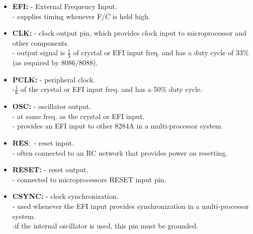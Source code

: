 \documentclass[12pt]{article}
\begin{document}
\begin{itemize}
	\item \textbf{EFI:} - External Frequency Input.\\
	- supplies timing whenever F/$\overline{C}$ is held high.\\
	
	\item\textbf{CLK:} - clock output pin, which provides clock input to microprocessor and other components.\\
	
	- output signal is $\frac{1}{3}$ of crystal or EFI input freq. and has a duty cycle of 33\%(as required by 8086/8088). \\
	
	\item \textbf{PCLK:} - peripheral clock.\\
	-$\frac{1}{6}$ of the crystal or EFI input freq. and has a 50\% duty cycle.
	
	\item \textbf{OSC:} - oscillator output.\\
	- at same freq. as the crystal or EFI input.\\
	- provides an EFI input to other 8284A in a multi-processor system.\\
	
	\item $\overline{\textbf{RES}}:$ - reset input.\\
	- often connected to an RC network that provides power on resetting.\\
	
	\item\textbf{RESET:} - reset output.\\
	- connected to microprocessors RESET input pin.\\
	
	\item \textbf{CSYNC:} - clock synchronization.\\
	- used whenever the EFI input provides synchronization in a multi-processor system.\\
	-if the internal oscillator is used, this pin must be grounded.\\  
	  
\end{itemize}



\end{document}
